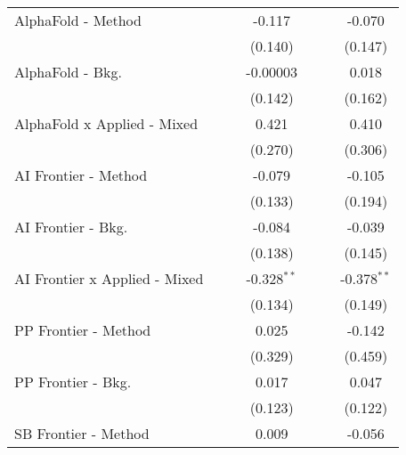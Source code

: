 \begin{tabular}{lcccccc}
   AlphaFold - Method             &         &                & -0.117        &              &              & -0.070\\   
                                  &         &                & (0.140)       &              &              & (0.147)\\   
   AlphaFold - Bkg.               &         &                & -0.00003      &              &              & 0.018\\   
                                  &         &                & (0.142)       &              &              & (0.162)\\   
   AlphaFold x Applied - Mixed    &         &                & 0.421         &              &              & 0.410\\   
                                  &         &                & (0.270)       &              &              & (0.306)\\   
   AI Frontier - Method           &         &                & -0.079        &              &              & -0.105\\   
                                  &         &                & (0.133)       &              &              & (0.194)\\   
   AI Frontier - Bkg.             &         &                & -0.084        &              &              & -0.039\\   
                                  &         &                & (0.138)       &              &              & (0.145)\\   
   AI Frontier x Applied - Mixed  &         &                & -0.328$^{**}$ &              &              & -0.378$^{**}$\\   
                                  &         &                & (0.134)       &              &              & (0.149)\\   
   PP Frontier - Method           &         &                & 0.025         &              &              & -0.142\\   
                                  &         &                & (0.329)       &              &              & (0.459)\\   
   PP Frontier - Bkg.             &         &                & 0.017         &              &              & 0.047\\   
                                  &         &                & (0.123)       &              &              & (0.122)\\   
   SB Frontier - Method           &         &                & 0.009         &              &              & -0.056\\   

\end{tabular}
